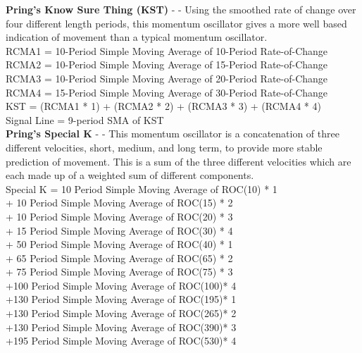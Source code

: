 \documentclass[conference]{IEEEtran}
\begin{document}

\noindent
\textbf{Pring's Know Sure Thing (KST)} - \cite{Pring2002} - Using the smoothed rate of change over four different length periods, this momentum oscillator gives a more well based indication of movement than a typical momentum oscillator. \\

\noindent
RCMA1 = 10-Period Simple Moving Average of 10-Period Rate-of-Change \\
RCMA2 = 10-Period Simple Moving Average of 15-Period Rate-of-Change \\
RCMA3 = 10-Period Simple Moving Average of 20-Period Rate-of-Change \\
RCMA4 = 15-Period Simple Moving Average of 30-Period Rate-of-Change \\
KST = (RCMA1 * 1) + (RCMA2 * 2) + (RCMA3 * 3) + (RCMA4 * 4) \\
Signal Line = 9-period SMA of KST \\

\noindent
\textbf{Pring's Special K} - \cite{Pring2002} - This momentum oscillator is a concatenation of three different velocities, short, medium, and long term, to provide more stable prediction of movement. This is a sum of the three different velocities which are each made up of a weighted sum of different components.\\

\noindent
Special K = 10 Period Simple Moving Average of ROC(10) * 1 \\
            + 10 Period Simple Moving Average of ROC(15) * 2 \\
            + 10 Period Simple Moving Average of ROC(20) * 3 \\
            + 15 Period Simple Moving Average of ROC(30) * 4 \\
            + 50 Period Simple Moving Average of ROC(40) * 1 \\
            + 65 Period Simple Moving Average of ROC(65) * 2 \\
            + 75 Period Simple Moving Average of ROC(75) * 3 \\
            +100 Period Simple Moving Average of ROC(100)* 4 \\
            +130 Period Simple Moving Average of ROC(195)* 1 \\
            +130 Period Simple Moving Average of ROC(265)* 2 \\
            +130 Period Simple Moving Average of ROC(390)* 3 \\
            +195 Period Simple Moving Average of ROC(530)* 4 \\
\end{document}
